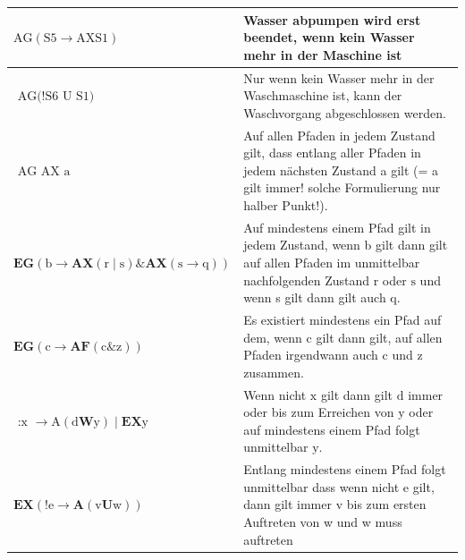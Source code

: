 \documentclass[5pt]{article}
\begin{document}
\begin{multicols*}{2}
\begin{tabular}{|p{}|p{}|}
    \hline
    $\mathrm{AG}(\mathrm{S} 5 \rightarrow \mathrm{AX} \mathrm{S} 1)$ &Wasser abpumpen wird erst beendet, wenn kein Wasser mehr in der Maschine ist\\
    \hline
    $\text { AG(!S6 U S1) }$&Nur wenn kein Wasser mehr in der Waschmaschine ist, kann der Waschvorgang
    abgeschlossen werden.\\
    \hline
    $\text { AG AX } \mathrm{a}$  & Auf allen Pfaden in jedem Zustand gilt, dass entlang aller Pfaden in jedem nächsten Zustand a gilt (= a gilt immer! solche Formulierung nur halber Punkt!).\\
    \hline
    $\mathbf{E G}(\mathrm{b} \rightarrow \mathbf{A X}(\mathrm{r} \mid \mathrm{s}) \boldsymbol{\&} \mathbf{A X}(\mathrm{s} \rightarrow \mathrm{q}))$ & Auf mindestens einem Pfad gilt in jedem Zustand, wenn b gilt dann gilt auf allen Pfaden im unmittelbar nachfolgenden Zustand $\mathrm{r}$ oder $\mathrm{s}$ und wenn s gilt dann gilt auch $\mathrm{q}$.\\
    \hline
    $\mathbf{E G}(\mathrm{c} \rightarrow \mathbf{A F}(\mathrm{c} \& \mathrm{z}))$ & Es existiert mindestens ein Pfad auf dem, wenn c gilt dann gilt, auf allen Pfaden irgendwann auch $\mathrm{c}$ und $\mathrm{z}$ zusammen.\\
    \hline
    $\text { :x } \rightarrow \mathrm{A}(\mathrm{d} \mathbf{W} \mathrm{y}) \mid \mathbf{E X} \mathrm{y}$ & Wenn nicht $\mathrm{x}$ gilt dann gilt $\mathrm{d}$ immer oder bis zum Erreichen von $\mathrm{y}$ oder auf mindestens einem Pfad folgt unmittelbar $\mathrm{y}$.\\
    \hline
    $\mathbf{E X}(! \mathrm{e} \rightarrow \mathbf{A}(\mathrm{v} \mathbf{U} \mathrm{w}))$ & Entlang mindestens einem Pfad folgt unmittelbar dass wenn nicht e gilt, dann gilt immer $\mathrm{v}$ bis zum ersten Auftreten von w und w muss auftreten\\
    \hline
\end{tabular}
\end{multicols*}
\end{document}
